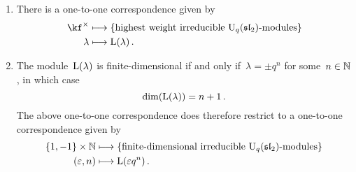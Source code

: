\documentclass[a4paper, 11pt, oneside]{scrartcl}
\begin{document}
\begin{theorem}
  \leavevmode
  \begin{enumerate}
    \item
      There is a one-to-one correspondence given by
      \begin{align*}
        \kf^\times
        &\longmapsto
        \{
          \text{highest weight irreducible~\modules{$\Univ_q(\sllie_2)$}}
        \}
        \\
        \lambda
        &\longmapsto
        \irred(\lambda) \,.
      \end{align*}
    \item
      The module~$\operatorname{L}(\lambda)$ is finite-dimensional if and only if~$\lambda = \pm q^n$ for some~$n \in \mathbb{N}$, in which case
      \[
        \dim(\operatorname{L}(\lambda))
        =
        n + 1 \,.
      \]
      The above one-to-one correspondence does therefore restrict to a one-to-one correspondence given by
      \begin{align*}
        \{ 1, -1 \} \times \Natural
        &\longmapsto
        \{
          \text{finite-dimensional irreducible~\modules{$\Univ_q(\sllie_2)$}}
        \}
        \\
        (\varepsilon, n)
        &\longmapsto
        \irred(\varepsilon q^n) \,.
      \end{align*}
  \end{enumerate}
\end{theorem}
\end{document}
